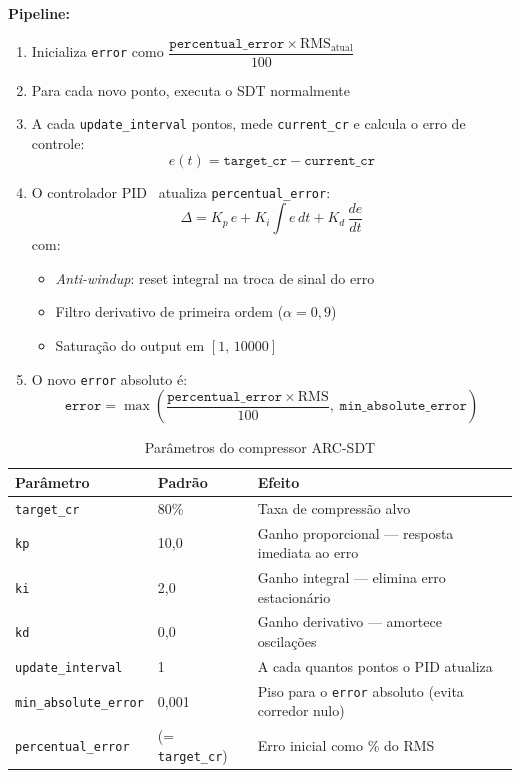 \documentclass[12pt, a4paper]{article}
\begin{document}
\textbf{Pipeline:}
\begin{enumerate}
    \item Inicializa \texttt{error} como $\dfrac{\mathtt{percentual\_error} \times \mathrm{RMS}_{\mathrm{atual}}}{100}$
    \item Para cada novo ponto, executa o SDT normalmente
    \item A cada \texttt{update\_interval} pontos, mede \texttt{current\_cr} e calcula o erro de controle:
    \[
        e(t) = \mathtt{target\_cr} - \mathtt{current\_cr}
    \]
    \item O controlador PID~\cite{astrom1995pid} atualiza \texttt{percentual\_error}:
    \begin{equation}
        \Delta = K_p \, e + K_i \int e \, dt + K_d \, \frac{de}{dt}
    \end{equation}
    com:
    \begin{itemize}
        \item \textit{Anti-windup}: reset integral na troca de sinal do erro
        \item Filtro derivativo de primeira ordem ($\alpha = 0{,}9$)
        \item Saturação do output em $[1,\, 10000]$
    \end{itemize}
    \item O novo \texttt{error} absoluto é:
    \[
        \mathtt{error} = \max\!\left(\frac{\mathtt{percentual\_error} \times \mathrm{RMS}}{100},\; \mathtt{min\_absolute\_error}\right)
    \]
\end{enumerate}

\begin{table}[H]
\centering
\caption{Parâmetros do compressor ARC-SDT}
\begin{tabular}{llp{7cm}}
\toprule
\textbf{Parâmetro} & \textbf{Padrão} & \textbf{Efeito} \\
\midrule
\texttt{target\_cr}           & 80\%  & Taxa de compressão alvo \\
\texttt{kp}                   & 10{,}0 & Ganho proporcional — resposta imediata ao erro \\
\texttt{ki}                   & 2{,}0 & Ganho integral — elimina erro estacionário \\
\texttt{kd}                   & 0{,}0 & Ganho derivativo — amortece oscilações \\
\texttt{update\_interval}     & 1     & A cada quantos pontos o PID atualiza \\
\texttt{min\_absolute\_error} & 0{,}001 & Piso para o \texttt{error} absoluto (evita corredor nulo) \\
\texttt{percentual\_error}    & (= \texttt{target\_cr}) & Erro inicial como \% do RMS \\
\bottomrule
\end{tabular}
\end{table}
\end{document}
